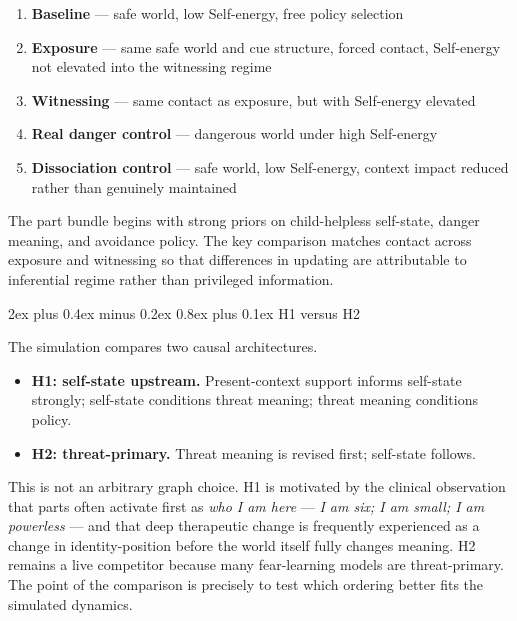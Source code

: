 \documentclass[12pt,a4paper]{article}
\makeatletter
\providecommand{\tightlist}{%
  \setlength{\itemsep}{0pt}\setlength{\parskip}{0pt}}
\renewcommand\subsection{\@startsection{subsection}{2}{0pt}%
  {2ex plus 0.4ex minus 0.2ex}%
  {0.8ex plus 0.1ex}%
  {\normalsize\itshape}}
\makeatother
\begin{document}
\begin{enumerate}
\def\labelenumi{\arabic{enumi}.}
\tightlist
\item
  \textbf{Baseline} --- safe world, low Self-energy, free policy
  selection
\item
  \textbf{Exposure} --- same safe world and cue structure, forced
  contact, Self-energy not elevated into the witnessing regime
\item
  \textbf{Witnessing} --- same contact as exposure, but with Self-energy
  elevated
\item
  \textbf{Real danger control} --- dangerous world under high
  Self-energy
\item
  \textbf{Dissociation control} --- safe world, low Self-energy, context
  impact reduced rather than genuinely maintained
\end{enumerate}

The part bundle begins with strong priors on child-helpless self-state,
danger meaning, and avoidance policy. The key comparison matches contact
across exposure and witnessing so that differences in updating are
attributable to inferential regime rather than privileged information.

\subsection{H1 versus H2}\label{h1-versus-h2}

The simulation compares two causal architectures.

\begin{itemize}
\tightlist
\item
  \textbf{H1: self-state upstream.} Present-context support informs
  self-state strongly; self-state conditions threat meaning; threat
  meaning conditions policy.
\item
  \textbf{H2: threat-primary.} Threat meaning is revised first;
  self-state follows.
\end{itemize}

This is not an arbitrary graph choice. H1 is motivated by the clinical
observation that parts often activate first as \emph{who I am here} ---
\emph{I am six; I am small; I am powerless} --- and that deep
therapeutic change is frequently experienced as a change in
identity-position before the world itself fully changes meaning. H2
remains a live competitor because many fear-learning models are
threat-primary. The point of the comparison is precisely to test which
ordering better fits the simulated dynamics.
\end{document}
